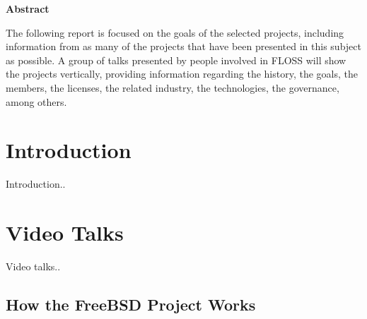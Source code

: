 \documentclass[11pt]{article} %
\begin{document}

\thispagestyle{empty}
{\bf \huge Abstract}

\vspace{10 mm}

The following report is focused on the goals of the selected projects, including information from as many of the projects that have been presented in this subject as possible. A group of talks presented by people involved in FLOSS will show the projects vertically, providing information regarding the history, the goals, the members, the licenses, the related industry, the technologies, the governance, among others.

\newpage


\tableofcontents %

\newpage


\section{Introduction}

Introduction..


\section{Video Talks}

Video talks..


\subsection{How the FreeBSD Project Works}
\end{document}
